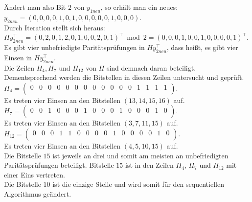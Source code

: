 \begin{Beispiel}
    Ändert man also Bit $2$ von $y_{1neu}$, so erhält man ein neues:\\
    $y_{2neu} = (0,0,0,0,1,0,1,0,0,0,0,0,1,0,0,0).$\\
    
    Durch Iteration stellt sich heraus:\\
    $Hy_{2neu}^\intercal = (0,2,0,1,2,0,1,0,0,2,0,1)^\intercal \bmod 2 = (0,0,0,1,0,0,1,0,0,0,0,1)^\intercal$.\\
    
    Es gibt vier unbefriedigte Paritätsprüfungen in $Hy_{2neu}^\intercal$, 
    dass hei\ss{}t, es gibt vier Einsen in $Hy_{2neu}^\intercal.$\\
    Die Zeilen $H_4, H_7$ und $H_{12}$ von $H$ sind demnach daran beteiligt.\\ 
    Dementsprechend werden die Bitstellen in diesen Zeilen untersucht und geprüft.\\
    
    $H_4= \left( \begin{array}{rrrrrrrrrrrrrrrr}
        0 & 0 & 0 & 0 & 0 & 0 & 0 & 0 & 0 & 0 & 0 & 0 & 1 & 1 & 1 & 1 \\
       \end{array}\right). 
    $\\
    Es treten vier Einsen an den Bitstellen $(13, 14, 15, 16)$ auf.\\
    
    $H_7= \left( \begin{array}{rrrrrrrrrrrrrrrr}
        0 & 0 & 1 & 0 & 0 & 0 & 1 & 0 & 0 & 0 & 1 & 0 & 0 & 0 & 1 & 0 \\
       \end{array}\right). 
    $\\
    Es treten vier Einsen an den Bitstellen $(3, 7, 11, 15)$ auf.\\
    
    $H_{12}= \left( \begin{array}{rrrrrrrrrrrrrrrr}
        0 & 0 & 0 & 1 & 1 & 0 & 0 & 0 & 0 & 1 & 0 & 0 & 0 & 0 & 1 & 0 \\
       \end{array}\right). 
    $\\
    Es treten vier Einsen an den Bitstellen $(4, 5, 10, 15)$ auf.\\
    
    Die Bitstelle $15$ ist jeweils an drei und somit am meisten an unbefriedigten Paritätsprüfungen beteiligt.
    Bitstelle $15$ ist in den Zeilen $H_4$, $H_7$ und $H_{12}$ mit einer Eins vertreten.\\
    Die Bitstelle $10$ ist die einzige Stelle und wird somit für den sequentiellen Algorithmus geändert.\\
    

\end{Beispiel}
